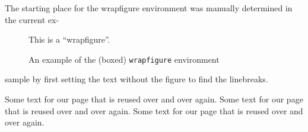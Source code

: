 \documentclass{tlc2/ttctexa}
\newcommand\sample{Some text for our page
 that is reused over and over again. }
\begin{document}
The starting place for the wrapfigure
environment was manually determined in
the current ex-
\begin{figure}
  \centering
  This is a ``wrapfigure''.
  \caption{An example of the (boxed)
    \texttt{wrapfigure} environment}
\end{figure}
sample by first setting the text without
the figure to find the linebreaks.

\sample \sample \sample
\end{document}
